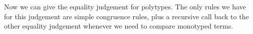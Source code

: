 \documentclass[12pt]{article}
\begin{document}

\noindent Now we can give the equality judgement for polytypes.  The
only rules we have for this judgement are simple congruence rules, 
plus a recursive call back to the other equality judgement whenever
we need to compare monotyped terms. 
\end{document}

